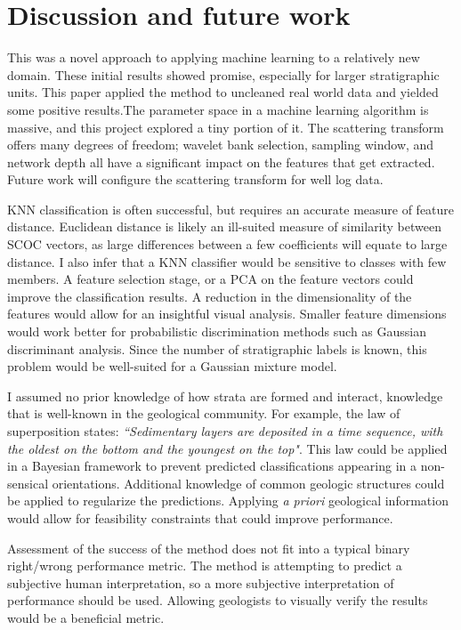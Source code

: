 \documentclass{article} %
\begin{document}
\section{Discussion and future work}
This was a novel approach to applying machine learning to a relatively
new domain. These initial results showed promise, especially for
larger stratigraphic units. This paper applied the method to uncleaned real world data and yielded
some positive results.The parameter space in a machine learning algorithm is massive, and this project
explored a tiny portion of it. The scattering transform offers many
degrees of freedom; wavelet bank selection, sampling window, and
network depth all have a significant impact on the features that get
extracted. Future work will configure the scattering transform for well log data.

KNN classification is often successful, but requires an
accurate measure of feature distance. Euclidean distance is likely an ill-suited measure
of similarity between SCOC vectors, as large differences between a few
coefficients will equate to large distance. I also infer that a KNN
classifier would be sensitive to classes with few members. A feature selection stage,
or a PCA on the feature vectors could improve the classification
results. A reduction in the dimensionality of the features would allow
for an insightful  visual analysis. Smaller feature dimensions would work better for probabilistic discrimination
methods such as Gaussian discriminant analysis. Since the number of
stratigraphic labels is known, this problem would be well-suited
for a Gaussian mixture model.

I assumed no prior knowledge of how strata are formed and
interact, knowledge that is well-known in the geological
community. For example, the law of superposition states: \textit{``Sedimentary
layers are deposited in a time sequence, with the oldest on the bottom
and the youngest on the top"}. This law could be applied in a Bayesian
framework to prevent predicted classifications appearing in a
non-sensical orientations. Additional knowledge of common geologic
structures could be applied to regularize the predictions. Applying
\textit{a priori} geological information would allow for feasibility
constraints that could improve performance.

Assessment of the success of the method does not fit into a typical
binary right/wrong performance metric. The method is attempting to
predict a subjective human interpretation, so a more subjective
interpretation of performance should be used. Allowing geologists to visually verify the results
would be a beneficial metric.
\end{document}
